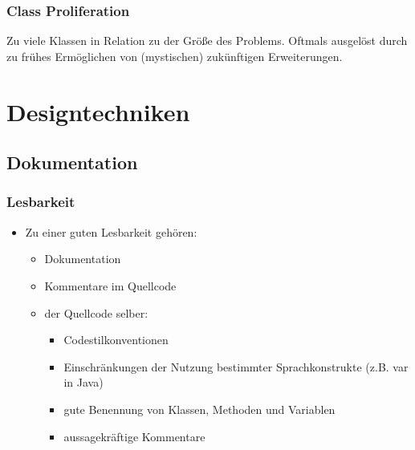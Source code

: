 \documentclass[
    ngerman,
    color=3b,
    summary,
    boxarc,
    main,
]{rubos-tuda-template}
\begin{document}
\subsubsection{Class Proliferation}
Zu viele Klassen in Relation zu der Größe des Problems. Oftmals ausgelöst durch zu frühes Ermöglichen von (mystischen) zukünftigen Erweiterungen.

\clearpage
\section{Designtechniken}
\subsection{Dokumentation}
\subsubsection{Lesbarkeit}\begin{itemize}
    \item Zu einer guten Lesbarkeit gehören:\begin{itemize}
              \item Dokumentation
              \item Kommentare im Quellcode
              \item der Quellcode selber:\begin{itemize}
                        \item Codestilkonventionen
                        \item Einschränkungen der Nutzung bestimmter Sprachkonstrukte (z.B. var in Java)
                        \item gute Benennung von Klassen, Methoden und Variablen
                        \item aussagekräftige Kommentare
                    \end{itemize}
          \end{itemize}
\end{itemize}
\end{document}

